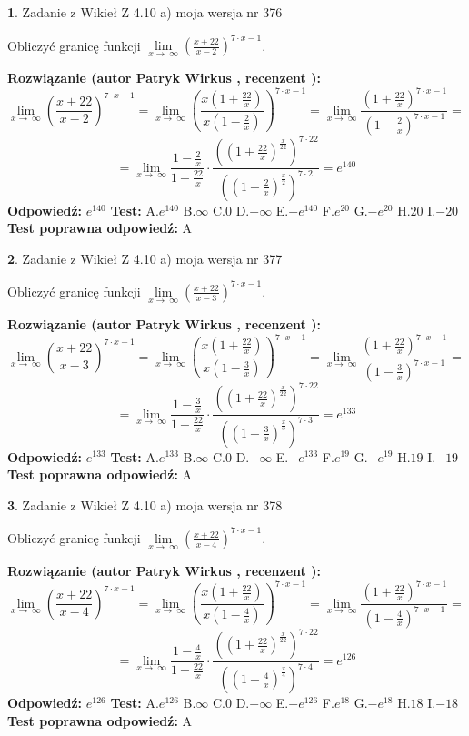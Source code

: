 \documentclass[12pt, a4paper]{article}
\theoremstyle{definition} %
\newtheorem{zad}{}
\newcommand{\zadStart}[1]{\begin{zad}#1\newline}
\newcommand{\zadStop}{\end{zad}}
\newcommand{\rozwStart}[2]{\noindent \textbf{Rozwiązanie (autor #1 , recenzent #2): }\newline}
\newcommand{\rozwStop}{\newline}
\newcommand{\odpStart}{\noindent \textbf{Odpowiedź:}\newline}
\newcommand{\odpStop}{\newline}
\newcommand{\testStart}{\noindent \textbf{Test:}\newline}
\newcommand{\testStop}{\newline}
\newcommand{\kluczStart}{\noindent \textbf{Test poprawna odpowiedź:}\newline}
\newcommand{\kluczStop}{\newline}
\begin{document}
\zadStart{Zadanie z Wikieł Z 4.10 a) moja wersja nr 376}

Obliczyć granicę funkcji  $\lim\limits_{x\to\ \infty}(\frac{x+22}{x-2})^{7\cdot x-1}$.
\zadStop
\rozwStart{Patryk Wirkus}{}
$$\lim\limits_{x\to\ \infty}(\frac{x+22}{x-2})^{7\cdot x-1} = \lim\limits_{x\to\ \infty}(\frac{x(1+\frac{22}{x})}{x(1-\frac{2}{x})})^{7\cdot x-1}=\lim\limits_{x\to\ \infty}\frac{(1+\frac{22}{x})^{7\cdot x-1}}{(1-\frac{2}{x})^{7\cdot x-1}}=$$
$$=\lim\limits_{x\to\ \infty}\frac{1-\frac{2}{x}}{1+\frac{22}{x}}\cdot\frac{((1+\frac{22}{x})^{\frac{x}{22}})^{7\cdot22}}{((1-\frac{2}{x})^{\frac{x}{2}})^{7\cdot2}}=e^{140}$$
\rozwStop
\odpStart
$e^{140}$
\odpStop
\testStart
A.$e^{140}$ B.$\infty$ C.$0$ D.$-\infty$ E.$-e^{140}$
F.$e^{20}$ G.$-e^{20}$
H.$20$
I.$-20$
\testStop
\kluczStart
A
\kluczStop



\zadStart{Zadanie z Wikieł Z 4.10 a) moja wersja nr 377}

Obliczyć granicę funkcji  $\lim\limits_{x\to\ \infty}(\frac{x+22}{x-3})^{7\cdot x-1}$.
\zadStop
\rozwStart{Patryk Wirkus}{}
$$\lim\limits_{x\to\ \infty}(\frac{x+22}{x-3})^{7\cdot x-1} = \lim\limits_{x\to\ \infty}(\frac{x(1+\frac{22}{x})}{x(1-\frac{3}{x})})^{7\cdot x-1}=\lim\limits_{x\to\ \infty}\frac{(1+\frac{22}{x})^{7\cdot x-1}}{(1-\frac{3}{x})^{7\cdot x-1}}=$$
$$=\lim\limits_{x\to\ \infty}\frac{1-\frac{3}{x}}{1+\frac{22}{x}}\cdot\frac{((1+\frac{22}{x})^{\frac{x}{22}})^{7\cdot22}}{((1-\frac{3}{x})^{\frac{x}{3}})^{7\cdot3}}=e^{133}$$
\rozwStop
\odpStart
$e^{133}$
\odpStop
\testStart
A.$e^{133}$ B.$\infty$ C.$0$ D.$-\infty$ E.$-e^{133}$
F.$e^{19}$ G.$-e^{19}$
H.$19$
I.$-19$
\testStop
\kluczStart
A
\kluczStop



\zadStart{Zadanie z Wikieł Z 4.10 a) moja wersja nr 378}

Obliczyć granicę funkcji  $\lim\limits_{x\to\ \infty}(\frac{x+22}{x-4})^{7\cdot x-1}$.
\zadStop
\rozwStart{Patryk Wirkus}{}
$$\lim\limits_{x\to\ \infty}(\frac{x+22}{x-4})^{7\cdot x-1} = \lim\limits_{x\to\ \infty}(\frac{x(1+\frac{22}{x})}{x(1-\frac{4}{x})})^{7\cdot x-1}=\lim\limits_{x\to\ \infty}\frac{(1+\frac{22}{x})^{7\cdot x-1}}{(1-\frac{4}{x})^{7\cdot x-1}}=$$
$$=\lim\limits_{x\to\ \infty}\frac{1-\frac{4}{x}}{1+\frac{22}{x}}\cdot\frac{((1+\frac{22}{x})^{\frac{x}{22}})^{7\cdot22}}{((1-\frac{4}{x})^{\frac{x}{4}})^{7\cdot4}}=e^{126}$$
\rozwStop
\odpStart
$e^{126}$
\odpStop
\testStart
A.$e^{126}$ B.$\infty$ C.$0$ D.$-\infty$ E.$-e^{126}$
F.$e^{18}$ G.$-e^{18}$
H.$18$
I.$-18$
\testStop
\kluczStart
A
\kluczStop
\end{document}
